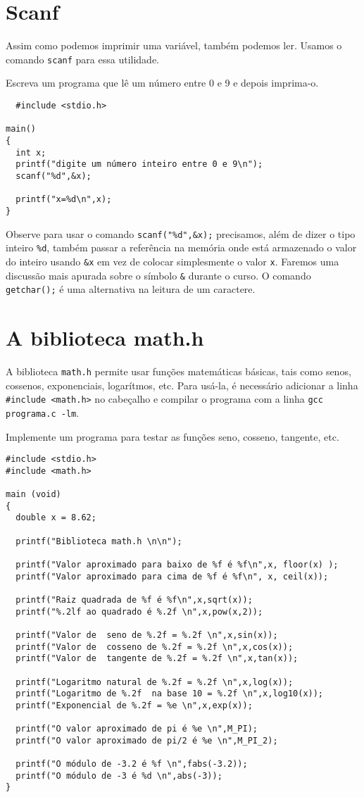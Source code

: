 \section{Scanf}
 Assim como podemos imprimir uma variável, também podemos ler. Usamos o comando \verb|scanf| para essa utilidade.
\begin{ex}
 Escreva um programa que lê um número entre 0 e 9 e depois imprima-o.
\end{ex}
 \begin{verbatim}
  #include <stdio.h>

main()
{
  int x;
  printf("digite um número inteiro entre 0 e 9\n");
  scanf("%d",&x);

  printf("x=%d\n",x); 
}
 \end{verbatim}
Observe para usar o comando \verb|scanf("%d",&x);| precisamos, além de dizer o tipo inteiro \verb|%d|, também passar a referência na memória onde está armazenado o valor do inteiro usando \verb|&x| em vez de colocar simplesmente o valor \verb|x|. Faremos uma discussão mais apurada sobre o símbolo \verb|&| durante o curso. O comando \verb|getchar();| é uma alternativa na leitura de um caractere.

\section{A biblioteca math.h}
A biblioteca \verb|math.h| permite usar funções matemáticas básicas, tais como senos, cossenos, exponenciais, logarítmos, etc. Para usá-la, é necessário adicionar a linha \verb|#include <math.h>| no cabeçalho e compilar o programa com a linha \verb|gcc programa.c -lm|.
\begin{ex}Implemente um programa para testar as funções seno, cosseno, tangente, etc.
\end{ex}
\begin{verbatim}
#include <stdio.h>
#include <math.h>
 
main (void)
{
  double x = 8.62;
  
  printf("Biblioteca math.h \n\n");

  printf("Valor aproximado para baixo de %f é %f\n",x, floor(x) );
  printf("Valor aproximado para cima de %f é %f\n", x, ceil(x));

  printf("Raiz quadrada de %f é %f\n",x,sqrt(x));
  printf("%.2lf ao quadrado é %.2f \n",x,pow(x,2));

  printf("Valor de  seno de %.2f = %.2f \n",x,sin(x));
  printf("Valor de  cosseno de %.2f = %.2f \n",x,cos(x));
  printf("Valor de  tangente de %.2f = %.2f \n",x,tan(x));

  printf("Logaritmo natural de %.2f = %.2f \n",x,log(x));
  printf("Logaritmo de %.2f  na base 10 = %.2f \n",x,log10(x));
  printf("Exponencial de %.2f = %e \n",x,exp(x));

  printf("O valor aproximado de pi é %e \n",M_PI);
  printf("O valor aproximado de pi/2 é %e \n",M_PI_2);

  printf("O módulo de -3.2 é %f \n",fabs(-3.2));
  printf("O módulo de -3 é %d \n",abs(-3));
}
\end{verbatim}



